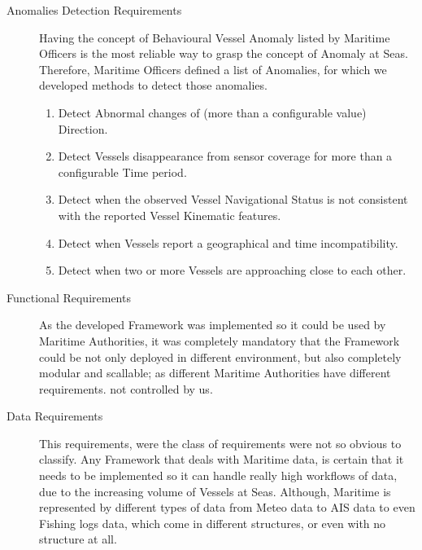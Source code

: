 \begin{description}
\item[Anomalies Detection Requirements] Having the concept of Behavioural Vessel Anomaly listed by Maritime Officers is the most reliable way to grasp the concept of Anomaly at Seas. Therefore, Maritime Officers defined a list of Anomalies, for which we developed methods to detect those anomalies. 
\begin{enumerate}[label=(\subscript{AR}{{\arabic*}})]
    \item
    Detect Abnormal changes of (more than a configurable value) Direction.
    \item
    Detect Vessels disappearance from sensor coverage for more than a configurable Time period.
    \item
    Detect when the observed Vessel Navigational Status is not consistent with the reported Vessel Kinematic features.
    \item
    Detect when Vessels report a geographical and time incompatibility.
    \item
    Detect when two or more Vessels are approaching close to each other.
\end{enumerate}










\item [Functional Requirements] As the developed Framework was implemented so it could be used by Maritime Authorities, it was completely mandatory that the Framework could be not only deployed in different environment, but also completely modular and scallable; as different Maritime Authorities have different requirements. 
not controlled by us.

\item [Data Requirements] This requirements, were the class of requirements were not so obvious to classify. Any Framework that deals with Maritime data, is certain that it needs to be implemented so it can handle really high workflows of data, due to the increasing volume of Vessels at Seas. Although, Maritime is represented by different types of data from Meteo data to AIS data to even Fishing logs data, which come in different structures, or even with no structure at all.
\end{description}

